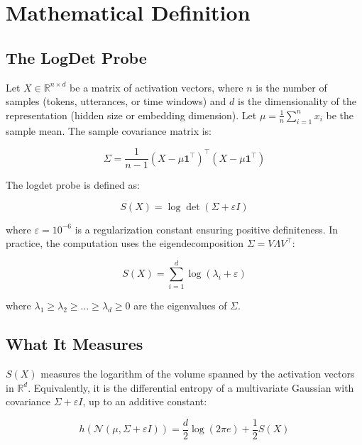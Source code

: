\documentclass[12pt,a4paper]{article}
\begin{document}
\section{Mathematical Definition}
\label{sec:def}

\subsection{The LogDet Probe}

Let $X \in \mathbb{R}^{n \times d}$ be a matrix of activation vectors, where $n$ is the number of samples (tokens, utterances, or time windows) and $d$ is the dimensionality of the representation (hidden size or embedding dimension). Let $\mu = \frac{1}{n}\sum_{i=1}^n x_i$ be the sample mean. The sample covariance matrix is:

\begin{equation}
\Sigma = \frac{1}{n-1}(X - \mu\bm{1}^\top)^\top (X - \mu\bm{1}^\top)
\end{equation}

The logdet probe is defined as:

\begin{equation}
\boxed{S(X) = \log \det(\Sigma + \varepsilon I)}
\end{equation}

where $\varepsilon = 10^{-6}$ is a regularization constant ensuring positive definiteness. In practice, the computation uses the eigendecomposition $\Sigma = V\Lambda V^\top$:

\begin{equation}
S(X) = \sum_{i=1}^d \log(\lambda_i + \varepsilon)
\end{equation}

where $\lambda_1 \geq \lambda_2 \geq \dots \geq \lambda_d \geq 0$ are the eigenvalues of $\Sigma$.

\subsection{What It Measures}

$S(X)$ measures the logarithm of the volume spanned by the activation vectors in $\mathbb{R}^d$. Equivalently, it is the differential entropy of a multivariate Gaussian with covariance $\Sigma + \varepsilon I$, up to an additive constant:

\begin{equation}
h(\mathcal{N}(\mu, \Sigma + \varepsilon I)) = \frac{d}{2}\log(2\pi e) + \frac{1}{2}S(X)
\end{equation}
\end{document}
